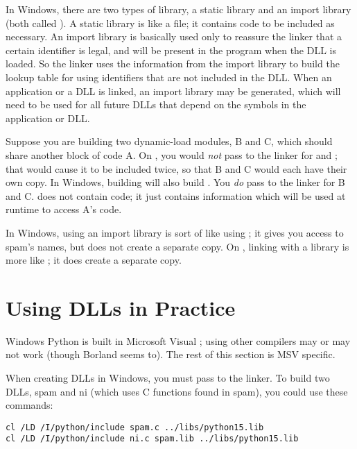 \documentclass{manual}
\begin{document}
In Windows, there are two types of library, a static library and an
import library (both called ).  A static library is like a
\UNIX{}  file; it contains code to be included as necessary.
An import library is basically used only to reassure the linker that a
certain identifier is legal, and will be present in the program when
the DLL is loaded.  So the linker uses the information from the
import library to build the lookup table for using identifiers that
are not included in the DLL.  When an application or a DLL is linked,
an import library may be generated, which will need to be used for all
future DLLs that depend on the symbols in the application or DLL.

Suppose you are building two dynamic-load modules, B and C, which should
share another block of code A.  On \UNIX{}, you would \emph{not} pass
 to the linker for  and ; that would
cause it to be included twice, so that B and C would each have their
own copy.  In Windows, building  will also build
.  You \emph{do} pass  to the linker for B and
C.   does not contain code; it just contains information
which will be used at runtime to access A's code.  

In Windows, using an import library is sort of like using ; it gives you access to spam's names, but does not create a
separate copy.  On \UNIX{}, linking with a library is more like
; it does create a separate copy.


\section{Using DLLs in Practice \label{win-dlls}}

Windows Python is built in Microsoft Visual \Cpp{}; using other
compilers may or may not work (though Borland seems to).  The rest of
this section is MSV\Cpp{} specific.

When creating DLLs in Windows, you must pass  to
the linker.  To build two DLLs, spam and ni (which uses C functions
found in spam), you could use these commands:

\begin{verbatim}
cl /LD /I/python/include spam.c ../libs/python15.lib
cl /LD /I/python/include ni.c spam.lib ../libs/python15.lib
\end{verbatim}
\end{document}
